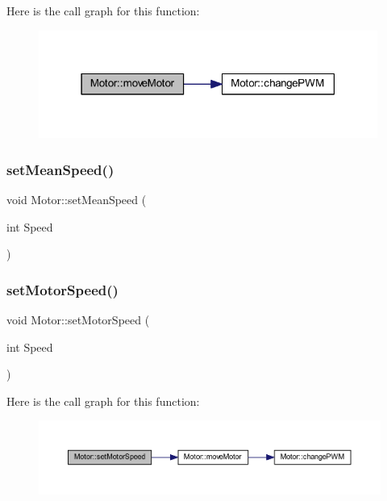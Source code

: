 Here is the call graph for this function\+:
\nopagebreak
\begin{figure}[H]
\begin{center}
\leavevmode
\includegraphics[width=315pt]{d1/d6b/class_motor_a06b855952ba7034f260063b6d94c4b3a_cgraph}
\end{center}
\end{figure}
\mbox{\label{class_motor_a468d680ba9e35742dacbb05028944cb3}} 
\subsubsection{\texorpdfstring{set\+Mean\+Speed()}{setMeanSpeed()}}
{\footnotesize\ttfamily void Motor\+::set\+Mean\+Speed (\begin{DoxyParamCaption}\item[{int}]{Speed }\end{DoxyParamCaption})}

\mbox{\label{class_motor_a72a29fd8773b5bfea30afc063d879072}} 
\subsubsection{\texorpdfstring{set\+Motor\+Speed()}{setMotorSpeed()}\hspace{0.1cm}{\footnotesize\ttfamily [1/2]}}
{\footnotesize\ttfamily void Motor\+::set\+Motor\+Speed (\begin{DoxyParamCaption}\item[{int}]{Speed }\end{DoxyParamCaption})}

Here is the call graph for this function\+:
\nopagebreak
\begin{figure}[H]
\begin{center}
\leavevmode
\includegraphics[width=350pt]{d1/d6b/class_motor_a72a29fd8773b5bfea30afc063d879072_cgraph}
\end{center}
\end{figure}
\mbox{\label{class_motor_af6e0f394e5d028bdd8cf9ce5e0fed919}} 
